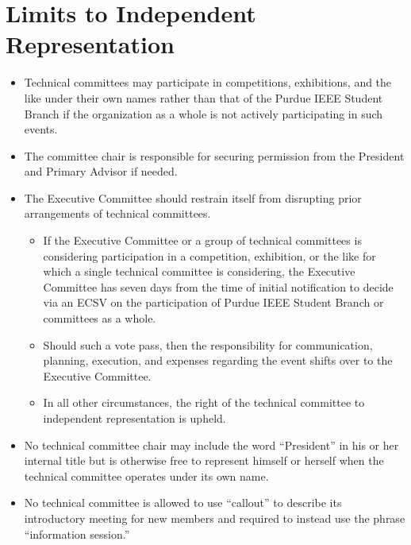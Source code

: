 \documentclass[12pt]{constitution}
\begin{document}
\section{Limits to Independent Representation}
\label{sec:tech_limrepres}
\begin{itemize}
    \item Technical committees may participate in competitions, exhibitions, and the like under their own names rather than that of the Purdue IEEE Student Branch if the organization as a whole is not actively participating in such events.
    \item The committee chair is responsible for securing permission from the President and Primary Advisor if needed.
    \item The Executive Committee should restrain itself from disrupting prior arrangements of technical committees.
    \begin{itemize}
        \item If the Executive Committee or a group of technical committees is considering participation in a competition, exhibition, or the like for which a single technical committee is considering, the Executive Committee has seven days from the time of initial notification to decide via an ECSV on the participation of Purdue IEEE Student Branch or committees as a whole.
        \item Should such a vote pass, then the responsibility for communication, planning, execution, and expenses regarding the event shifts over to the Executive Committee.
        \item In all other circumstances, the right of the technical committee to independent representation is upheld.
    \end{itemize}
    \item No technical committee chair may include the word ``President'' in his or her internal title but is otherwise free to represent himself or herself when the technical committee operates under its own name.
    \item No technical committee is allowed to use ``callout'' to describe its introductory meeting for new members and required to instead use the phrase ``information session.''
\end{itemize}
\end{document}
